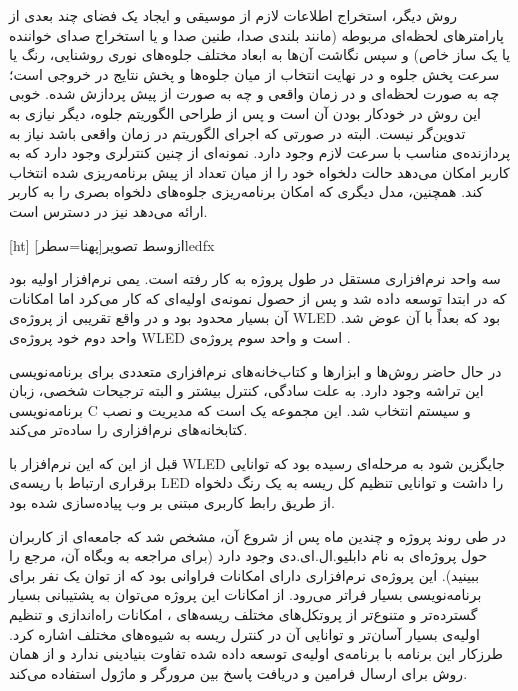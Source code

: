 روش دیگر، استخراج اطلاعات لازم از موسیقی و ایجاد یک فضای چند بعدی از پارامترهای لحظه‌ای مربوطه (مانند بلندی صدا، طنین صدا و یا استخراج صدای خواننده یا یک ساز خاص) و سپس نگاشت آن‌ها به ابعاد مختلف جلوه‌های نوری روشنایی، رنگ یا سرعت پخش جلوه و در نهایت انتخاب از میان جلوه‌ها و پخش نتایج در خروجی است؛ چه به صورت لحظه‌ای و در زمان واقعی و چه به صورت از پیش پردازش شده. خوبی این روش در خودکار بودن آن است و پس از طراحی الگوریتم جلوه، دیگر نیازی به تدوین‌گر نیست. البته در صورتی که اجرای الگوریتم در زمان واقعی باشد نیاز به پردازنده‌ی مناسب با سرعت لازم وجود دارد. نمونه‌ای از چنین کنترلری وجود دارد که به کاربر امکان می‌دهد حالت دلخواه خود را از میان تعداد از پیش برنامه‌ریزی شده انتخاب کند. همچنین، مدل دیگری که امکان برنامه‌ریزی جلوه‌های دلخواه بصری را به کاربر ارائه می‌دهد نیز در دسترس است.

[ht]
‌ازوسط
‌تصویر[پهنا=‌سطر]{ledfx}


سه واحد نرم‌افزاری مستقل در طول پروژه به کار رفته است. یمی نرم‌افزار اولیه بود که در ابتدا توسعه داده شد و پس از حصول نمونه‌ی اولیه‌ای که کار می‌کرد اما امکانات آن بسیار محدود بود و در واقع تقریبی از پروژه‌ی WLED بود که بعداً با آن عوض شد. واحد دوم خود پروژه‌ی WLED است و واحد سوم پروژه‌ی .


در حال حاضر روش‌ها و ابزارها و کتاب‌خانه‌های نرم‌افزاری متعددی برای برنامه‌نویسی این تراشه وجود دارد. به علت سادگی، کنترل بیشتر و البته ترجیحات شخصی، زبان برنامه‌نویسی C و سیستم  انتخاب شد. این مجموعه یک  است که مدیریت و نصب کتابخانه‌های نرم‌افزاری را ساده‌تر می‌کند.

قبل از این که این نرم‌افزار با WLED جایگزین شود به مرحله‌ای رسیده بود که توانایی برقراری ارتباط با ریسه‌ی LED را داشت و توانایی تنظیم کل ریسه به یک رنگ دلخواه از طریق رابط کاربری مبتنی بر وب پیاده‌سازی شده بود.


در طی روند پروژه و چندین ماه پس از شروع آن، مشخص شد که جامعه‌ای از کاربران حول پروژه‌ای  به نام دابلیو.ال.ای.دی وجود دارد (برای مراجعه به وبگاه آن،‌ مرجع  را ببینید). این پروژه‌ی نرم‌افزاری دارای امکانات فراوانی بود که از توان یک نفر برای برنامه‌نویسی بسیار فراتر می‌رود. از امکانات این پروژه می‌توان به پشتیبانی بسیار گسترده‌تر و متنوع‌تر از پروتکل‌های مختلف ریسه‌های ، امکانات راه‌اندازی و تنظیم اولیه‌ی  بسیار آسان‌تر و توانایی آن در کنترل ریسه به شیوه‌های مختلف اشاره کرد. طرزکار این برنامه با برنامه‌ی اولیه‌ی توسعه داده شده تفاوت بنیادینی ندارد و از همان روش برای ارسال فرامین و دریافت پاسخ بین مرورگر و ماژول  استفاده می‌کند.

